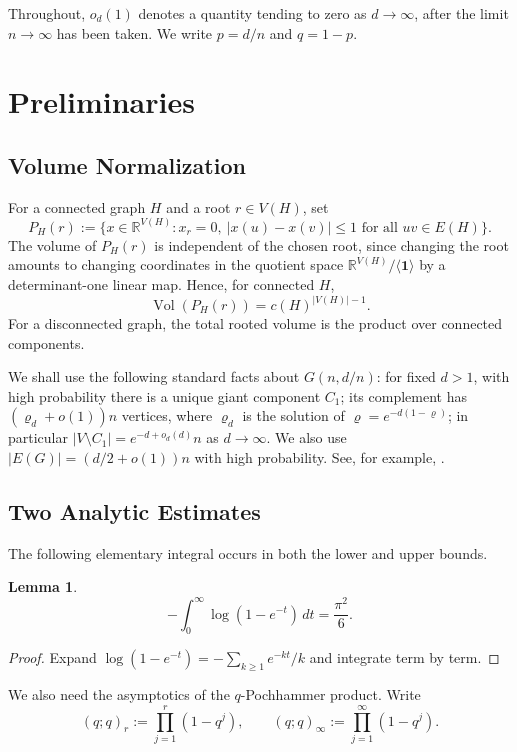 \documentclass[11pt]{article}
\newtheorem{lemma}[theorem]{Lemma}
\theoremstyle{definition}
\DeclareMathOperator{\Vol}{Vol}
\newcommand{\RR}{\mathbb{R}}
\begin{document}
\bigskip
\noindent
Throughout, $o_d(1)$ denotes a quantity tending to zero as $d\to\infty$, after the limit $n\to\infty$ has been taken.  We write $p=d/n$ and $q=1-p$.

\section{Preliminaries}

\subsection{Volume Normalization}

For a connected graph $H$ and a root $r\in V(H)$, set
\[
  P_H(r):=\{x\in\RR^{V(H)}:x_r=0,
  \ |x(u)-x(v)|\le1\text{ for all }uv\in E(H)\}.
\]
The volume of $P_H(r)$ is independent of the chosen root, since changing the root amounts to changing coordinates in the quotient space $\RR^{V(H)}/\langle\mathbf 1\rangle$ by a determinant-one linear map.  Hence, for connected $H$,
\[
  \Vol(P_H(r))=c(H)^{|V(H)|-1}.
\]
For a disconnected graph, the total rooted volume is the product over connected components.

\bigskip
\noindent
We shall use the following standard facts about $G(n,d/n)$: for fixed $d>1$, with high probability there is a unique giant component $C_1$; its complement has $(\varrho_d+o(1))n$ vertices, where $\varrho_d$ is the solution of $\varrho=e^{-d(1-\varrho)}$; in particular $|V\setminus C_1|=e^{-d+o_d(d)}n$ as $d\to\infty$.  We also use $|E(G)|=(d/2+o(1))n$ with high probability.  See, for example, \cite[Chapters~5--6]{JansonLuczakRucinski}.

\subsection{Two Analytic Estimates}

The following elementary integral occurs in both the lower and upper bounds.

\begin{lemma}\label{lem:zeta-integral}
\[
  -\int_0^\infty \log{(1-e^{-t})}\,dt=\frac{\pi^2}{6}.
\]
\end{lemma}

\begin{proof}
Expand $\log(1-e^{-t})=-\sum_{k\ge1}e^{-kt}/k$ and integrate term by term.
\end{proof}

\smallskip
\noindent
We also need the asymptotics of the $q$-Pochhammer product.  Write
\[
  (q;q)_r:=\prod_{j=1}^r(1-q^j),\qquad
  (q;q)_\infty:=\prod_{j=1}^\infty(1-q^j).
\]
\end{document}

